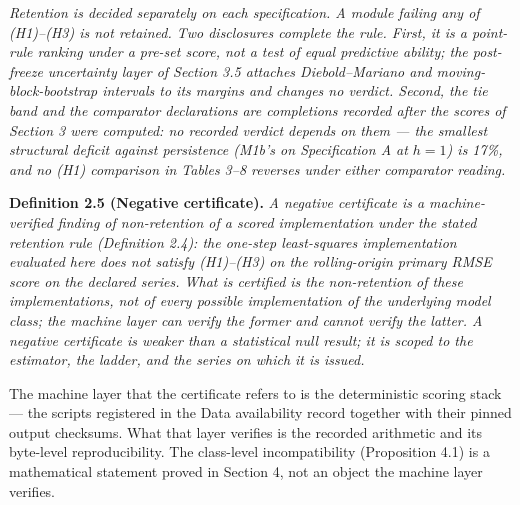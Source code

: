 \documentclass[11pt]{article}
\begin{document}
\emph{Retention is decided separately on each specification. A module
failing any of (H1)--(H3) is not retained. Two disclosures complete the
rule. First, it is a point-rule ranking under a pre-set score, not a
test of equal predictive ability; the post-freeze uncertainty layer of
Section 3.5 attaches Diebold--Mariano and moving-block-bootstrap
intervals to its margins and changes no verdict. Second, the tie band
and the comparator declarations are completions recorded after the
scores of Section 3 were computed: no recorded verdict depends on them
--- the smallest structural deficit against persistence (M1b's on
Specification A at \(h=1\)) is 17\%, and no (H1) comparison in Tables
3--8 reverses under either comparator reading.}

\textbf{Definition 2.5 (Negative certificate).} \emph{A negative
certificate is a machine-verified finding of non-retention of a scored
implementation under the stated retention rule (Definition 2.4): the
one-step least-squares implementation evaluated here does not satisfy
(H1)--(H3) on the rolling-origin primary RMSE score on the declared
series. What is certified is the non-retention of these implementations,
not of every possible implementation of the underlying model class; the
machine layer can verify the former and cannot verify the latter. A negative certificate is weaker than a statistical null result;
it is scoped to the estimator, the ladder, and the series on which it is
issued.}

The machine layer that the certificate refers to is the deterministic
scoring stack --- the scripts registered in the Data availability record
together with their pinned output checksums. What that layer verifies is
the recorded arithmetic and its byte-level reproducibility. The
class-level incompatibility (Proposition 4.1) is a mathematical
statement proved in Section 4, not an object the machine layer verifies.
\end{document}

